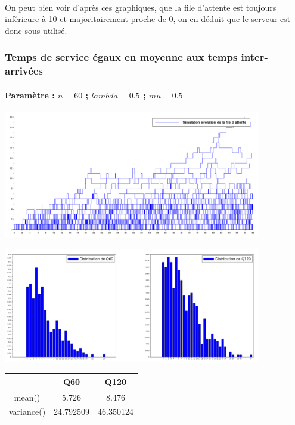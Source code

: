 \documentclass{article}
\begin{document}
\paragraph{} On peut bien voir d'après ces graphiques, que la file d'attente est toujours inférieure à 10 et majoritairement proche de 0, on en déduit que le serveur est donc sous-utilisé.

\subsubsection{Temps de service égaux en moyenne aux temps inter-arrivées}
\paragraph{Paramètre : $n=60$ ; $lambda=0.5$ ; $mu=0.5$}
\begin{center}
	\includegraphics[width=425px]{img/egal.PNG}
\end{center}
\begin{center}
	\includegraphics[width=425px]{img/egal/dist.png}
\end{center}
\begin{center}
	\begin{tabular}{c|cc}
		\hline \hline
		& Q60 & Q120 \\
		\hline 
		mean() & 5.726 & 8.476 \\
		variance() & 24.792509 & 46.350124 \\
		\hline \hline
	\end{tabular}
\end{center}
\end{document}
